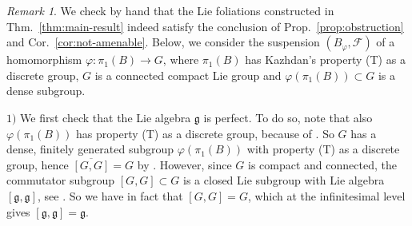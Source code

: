 \documentclass[11pt, letterpaper, oneside,reqno]{amsart}
\theoremstyle{plain}
\theoremstyle{underline}
\theoremstyle{definition}
\theoremstyle{remark}
\newtheorem{remark}[thm]{Remark}
\begin{document}
	\begin{remark}
		We check by hand that the Lie foliations constructed in Thm.~\ref{thm:main-result} indeed satisfy the conclusion of Prop.~\ref{prop:obstruction} and Cor.~\ref{cor:not-amenable}. Below, we consider the suspension $(B_{\varphi},\mathcal{F})$ of a homomorphism $\varphi:\pi_1(B)\rightarrow G$, where $\pi_1(B)$ has Kazhdan's property (T) as a discrete group, $G$ is a connected compact Lie group and $\varphi(\pi_1(B))\subset G$ is a dense subgroup.
		
		\vspace{0.2cm}
		
		$1)$ We first check that the Lie algebra $\mathfrak{g}$ is perfect. To do so, note that also $\varphi(\pi_1(B))$ has property (T) as a discrete group, because of \cite[Thm.~1.3.4]{Kazhdan}. So $G$ has a dense, finitely generated subgroup $\varphi(\pi_1(B))$ with property (T) as a discrete group, hence $\overline{[G,G]}=G$ by \cite[Thm.~3]{Cornulier}. However, since $G$ is compact and connected, the commutator subgroup $[G,G]\subset G$ is a closed Lie subgroup with Lie algebra $[\mathfrak{g},\mathfrak{g}]$, see \cite[Thm.~5.21]{Sepanski}. So we have in fact that $[G,G]=G$, which at the infinitesimal level gives $[\mathfrak{g},\mathfrak{g}]=\mathfrak{g}$.
		

\end{remark}
\end{document}
